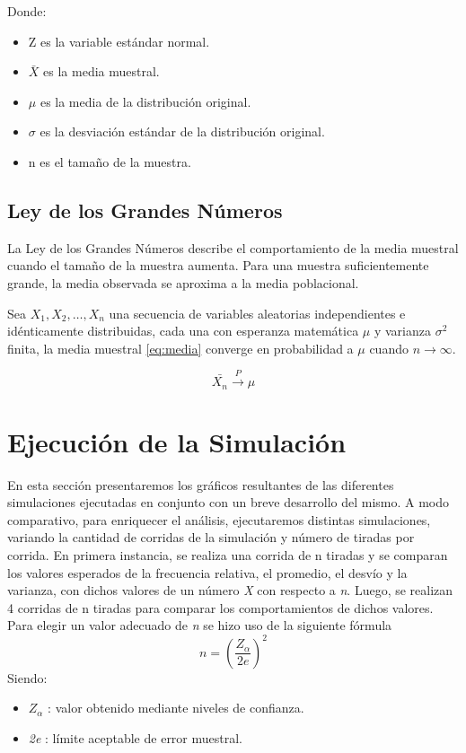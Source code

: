 \documentclass{article}
\begin{document}
\par Donde:
\begin{itemize}
    \item Z es la variable estándar normal.
    \item $\bar{X}$ es la media muestral.
    \item $\mu$ es la media de la distribución original.
    \item $\sigma$ es la desviación estándar de la distribución original.
    \item {n} es el tamaño de la muestra.
\end{itemize}

\subsection{Ley de los Grandes Números}
\par La Ley de los Grandes Números describe el comportamiento de la media muestral cuando el tamaño de la muestra aumenta. Para una muestra suficientemente grande, la media observada se aproxima a la media poblacional.

\par Sea $X_1, X_2, \ldots , X_n$ una secuencia de variables aleatorias independientes e idénticamente distribuidas, cada una con esperanza matemática $\mu$ y varianza $\sigma^2$ finita, la media muestral \eqref{eq:media} converge en probabilidad a $\mu$ cuando $n \to \infty$.

\begin{equation}
    \bar{X_n} \xrightarrow{P} \mu
\end{equation}

\section{Ejecución de la Simulación}
\par  En esta sección presentaremos los gráficos resultantes de las diferentes simulaciones ejecutadas en conjunto con un breve desarrollo del mismo. A modo comparativo, para enriquecer el análisis, ejecutaremos distintas simulaciones, variando la cantidad de corridas de la simulación y número de tiradas por corrida.
En primera instancia, se realiza una corrida de n tiradas y se comparan los valores esperados de la frecuencia relativa, el promedio, el desvío y la varianza, con dichos valores de un número \textit{X} con respecto a \textit{n}. 
Luego, se realizan 4 corridas de n tiradas para comparar los comportamientos de dichos valores.
Para elegir un valor adecuado de \textit{n} se hizo uso de la siguiente fórmula
    \begin{equation}
            n = (\frac{Z_\alpha}{2e})^{2}
    \end{equation}
Siendo: 
\begin{itemize}
    \item \(Z_\alpha\) : valor obtenido mediante niveles de confianza. 
    \par 
    \item \textit{2e} : límite aceptable de error muestral.
\end{itemize}
\end{document}
